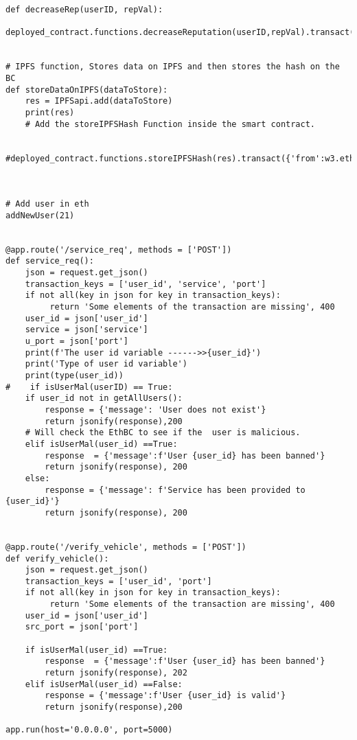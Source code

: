 \begin{linenumbers}
\begin{lstlisting}
def decreaseRep(userID, repVal):
    deployed_contract.functions.decreaseReputation(userID,repVal).transact({'from':w3.eth.accounts[0]})


# IPFS function, Stores data on IPFS and then stores the hash on the BC
def storeDataOnIPFS(dataToStore):
    res = IPFSapi.add(dataToStore)
    print(res)
    # Add the storeIPFSHash Function inside the smart contract.
    
    #deployed_contract.functions.storeIPFSHash(res).transact({'from':w3.eth.accounts[0]})



# Add user in eth
addNewUser(21)


@app.route('/service_req', methods = ['POST'])
def service_req():
    json = request.get_json()
    transaction_keys = ['user_id', 'service', 'port']
    if not all(key in json for key in transaction_keys):
         return 'Some elements of the transaction are missing', 400
    user_id = json['user_id']
    service = json['service']
    u_port = json['port']
    print(f'The user id variable ------>>{user_id}')
    print('Type of user id variable')
    print(type(user_id))
#    if isUserMal(userID) == True:
    if user_id not in getAllUsers():
        response = {'message': 'User does not exist'}
        return jsonify(response),200
    # Will check the EthBC to see if the  user is malicious.
    elif isUserMal(user_id) ==True:
        response  = {'message':f'User {user_id} has been banned'}
        return jsonify(response), 200
    else:
        response = {'message': f'Service has been provided to {user_id}'}
        return jsonify(response), 200


@app.route('/verify_vehicle', methods = ['POST'])
def verify_vehicle():
    json = request.get_json()
    transaction_keys = ['user_id', 'port']
    if not all(key in json for key in transaction_keys):
         return 'Some elements of the transaction are missing', 400
    user_id = json['user_id']
    src_port = json['port']

    if isUserMal(user_id) ==True:
        response  = {'message':f'User {user_id} has been banned'}
        return jsonify(response), 202
    elif isUserMal(user_id) ==False:
        response = {'message':f'User {user_id} is valid'}
        return jsonify(response),200

app.run(host='0.0.0.0', port=5000)
\end{lstlisting}
\end{linenumbers} 

\newpage

